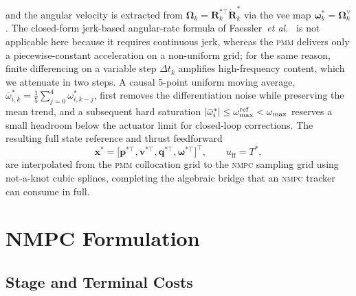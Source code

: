\documentclass{ieeeaccess}
\newcommand{\vect}[1]{\bm{#1}}
\newcommand{\mat}[1]{\mathbf{#1}}
\newcommand{\dt}{\Delta t}
\newcommand{\pmm}{\textsc{pmm}}
\newcommand{\nmpc}{\textsc{nmpc}}
\begin{document}
and the angular velocity is extracted from
$\mat{\Omega}_k=\mat{R}_k^{*\top}\dot{\mat{R}}_k^*$ via the vee map
$\vect{\omega}_k^*=\mat{\Omega}_k^\vee$.
The closed-form jerk-based angular-rate formula of Faessler~\textit{et
al.}~\cite{faessler2018differential} is not applicable here because it
requires continuous jerk, whereas the \pmm{} delivers only a
piecewise-constant acceleration on a non-uniform grid; for the same
reason, finite differencing on a variable step $\dt_k$ amplifies
high-frequency content, which we attenuate in two steps.
A causal 5-point uniform moving average,
$\bar{\omega}_{i,k}^*=\tfrac{1}{5}\sum_{j=0}^{4}\omega_{i,k-j}^*$, first
removes the differentiation noise while preserving the mean trend, and
a subsequent hard saturation $|\bar{\omega}_i^*|\leq\omega_{\max}^{\rm ref}
<\omega_{\max}$ reserves a small headroom below the actuator limit for
closed-loop corrections.
The resulting full state reference and thrust feedforward
\begin{equation}
  \vect{x}^*=
  \bigl[\vect{p}^{*\top},\vect{v}^{*\top},\vect{q}^{*\top},
        \vect{\omega}^{*\top}\bigr]^\top,\qquad
  u_\text{ff}=T^*,
  \label{eq:full_ref}
\end{equation}
are interpolated from the \pmm{} collocation grid to the \nmpc{}
sampling grid using not-a-knot cubic splines, completing the algebraic
bridge that an \nmpc{} tracker can consume in full.

\section{NMPC Formulation}
\label{sec:nmpc}

\subsection{Stage and Terminal Costs}
\label{sec:stage_cost}
\end{document}
